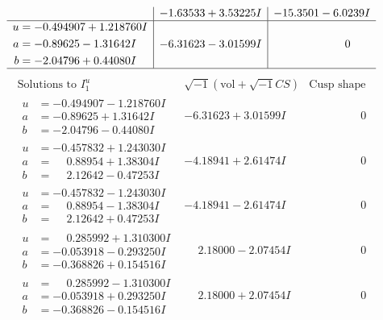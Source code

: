 \documentclass[1p]{elsarticle_modified}
\theoremstyle{definition}
\newcommand{\I}{\sqrt{-1}}
\begin{document}
$$\begin{array}{c|c|c}
 & -1.63533 + 3.53225 I & -15.3501 - 6.0239 I \\ \hline\begin{aligned}
u &= -0.494907 + 1.218760 I \\
a &= -0.89625 - 1.31642 I \\
b &= -2.04796 + 0.44080 I\end{aligned}
 & -6.31623 - 3.01599 I & \phantom{-0.000000 } 0\\
 \hline 
 \end{array}$$\newpage$$\begin{array}{c|c|c}  
\text{Solutions to }I^u_{1}& \I (\text{vol} + \sqrt{-1}CS) & \text{Cusp shape}\\
 \hline 
\begin{aligned}
u &= -0.494907 - 1.218760 I \\
a &= -0.89625 + 1.31642 I \\
b &= -2.04796 - 0.44080 I\end{aligned}
 & -6.31623 + 3.01599 I & \phantom{-0.000000 } 0 \\ \hline\begin{aligned}
u &= -0.457832 + 1.243030 I \\
a &= \phantom{-}0.88954 + 1.38304 I \\
b &= \phantom{-}2.12642 - 0.47253 I\end{aligned}
 & -4.18941 + 2.61474 I & \phantom{-0.000000 } 0 \\ \hline\begin{aligned}
u &= -0.457832 - 1.243030 I \\
a &= \phantom{-}0.88954 - 1.38304 I \\
b &= \phantom{-}2.12642 + 0.47253 I\end{aligned}
 & -4.18941 - 2.61474 I & \phantom{-0.000000 } 0 \\ \hline\begin{aligned}
u &= \phantom{-}0.285992 + 1.310300 I \\
a &= -0.053918 - 0.293250 I \\
b &= -0.368826 + 0.154516 I\end{aligned}
 & \phantom{-}2.18000 - 2.07454 I & \phantom{-0.000000 } 0 \\ \hline\begin{aligned}
u &= \phantom{-}0.285992 - 1.310300 I \\
a &= -0.053918 + 0.293250 I \\
b &= -0.368826 - 0.154516 I\end{aligned}
 & \phantom{-}2.18000 + 2.07454 I & \phantom{-0.000000 } 0 \\ \hline\begin{aligned}

\end{aligned}
\end{array}$$
\end{document}

